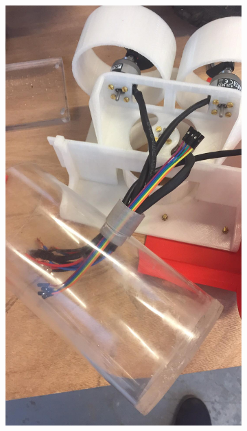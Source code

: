 \documentclass[a4paper,11pt]{report}
\begin{document}
							\begin{figure}[!h]
						\centering
							\begin{subfigure}[b]{0.3\textwidth}
								\includegraphics[width=\textwidth]{Photos/Capture10.jpeg}
							\end{subfigure}
							\begin{subfigure}[b]{0.3\textwidth}

\end{subfigure}
\end{figure}
\end{document}
